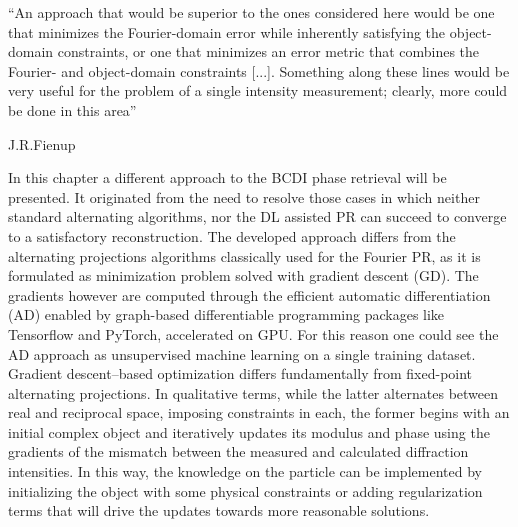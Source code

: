 
\epigraph{``An approach that would be superior to the ones considered here would be one that minimizes the Fourier-domain error while inherently satisfying the object-domain
constraints, or one that minimizes an error metric that combines the Fourier- and object-domain constraints [...]. 
Something along these lines would be very useful for the problem of a single intensity measurement; clearly, 
more could be done in this area''}{J.R.Fienup \cite{fienup_phase_1982}}

In this chapter a different approach to the BCDI phase retrieval will be presented. It originated from the need to resolve 
those cases in which neither standard alternating algorithms, nor the DL assisted PR can succeed to converge to a satisfactory 
reconstruction. The developed approach differs from the alternating projections algorithms classically used for 
the Fourier PR, as it is formulated as minimization problem solved with gradient descent (GD). The gradients however are computed 
through the efficient automatic differentiation (AD) enabled by graph-based differentiable programming packages like Tensorflow and 
PyTorch, accelerated on GPU. For this reason one could see the AD approach as unsupervised machine learning on a single training 
dataset.\\ 
Gradient descent–based optimization differs fundamentally from fixed-point alternating projections. In qualitative 
terms, while the latter alternates between real and reciprocal space, imposing constraints in each, the former begins 
with an initial complex object and iteratively updates its modulus and phase using the gradients of the mismatch between 
the measured and calculated diffraction intensities. In this way, the knowledge on the particle can be implemented 
by initializing the object with some physical constraints or adding regularization terms that will drive the updates 
towards more reasonable solutions. \\


